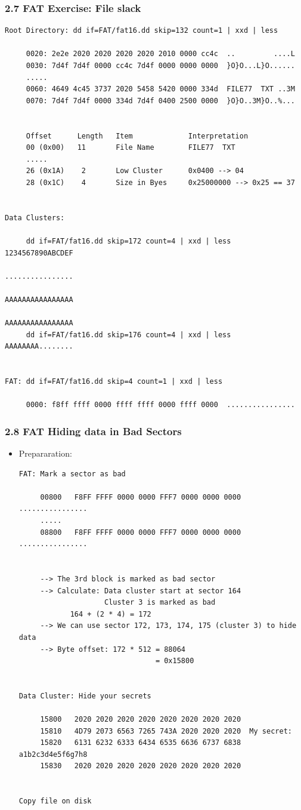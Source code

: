 \begin{frame}[fragile]
  \frametitle{2.7 FAT Exercise: File slack}
  \begin{lstlisting}[basicstyle=\tiny]
Root Directory: dd if=FAT/fat16.dd skip=132 count=1 | xxd | less

     0020: 2e2e 2020 2020 2020 2020 2010 0000 cc4c  ..         ....L
     0030: 7d4f 7d4f 0000 cc4c 7d4f 0000 0000 0000  }O}O...L}O......
     .....
     0060: 4649 4c45 3737 2020 5458 5420 0000 334d  FILE77  TXT ..3M
     0070: 7d4f 7d4f 0000 334d 7d4f 0400 2500 0000  }O}O..3M}O..%...
 
 
     Offset      Length   Item             Interpretation
     00 (0x00)   11       File Name        FILE77  TXT
     .....
     26 (0x1A)    2       Low Cluster      0x0400 --> 04
     28 (0x1C)    4       Size in Byes     0x25000000 --> 0x25 == 37

  
Data Clusters:

     dd if=FAT/fat16.dd skip=172 count=4 | xxd | less    1234567890ABCDEF
                                                         ................
                                                         AAAAAAAAAAAAAAAA
                                                         AAAAAAAAAAAAAAAA
     dd if=FAT/fat16.dd skip=176 count=4 | xxd | less    AAAAAAAA........

  
FAT: dd if=FAT/fat16.dd skip=4 count=1 | xxd | less

     0000: f8ff ffff 0000 ffff ffff 0000 ffff 0000  ................
\end{lstlisting}
\end{frame}


\begin{frame}[fragile]
  \frametitle{2.8 FAT Hiding data in Bad Sectors}
    \begin{itemize}
	  \item Prepararation:
  \begin{lstlisting}[basicstyle=\tiny]
FAT: Mark a sector as bad

     00800   F8FF FFFF 0000 0000 FFF7 0000 0000 0000  ................
     .....
     08800   F8FF FFFF 0000 0000 FFF7 0000 0000 0000  ................


     --> The 3rd block is marked as bad sector
     --> Calculate: Data cluster start at sector 164
                    Cluster 3 is marked as bad
		    164 + (2 * 4) = 172
     --> We can use sector 172, 173, 174, 175 (cluster 3) to hide data
     --> Byte offset: 172 * 512 = 88064
                                = 0x15800
                    

Data Cluster: Hide your secrets

     15800   2020 2020 2020 2020 2020 2020 2020 2020                  
     15810   4D79 2073 6563 7265 743A 2020 2020 2020  My secret:      
     15820   6131 6232 6333 6434 6535 6636 6737 6838  a1b2c3d4e5f6g7h8
     15830   2020 2020 2020 2020 2020 2020 2020 2020                  


Copy file on disk
\end{lstlisting}
    \end{itemize}
\end{frame}


